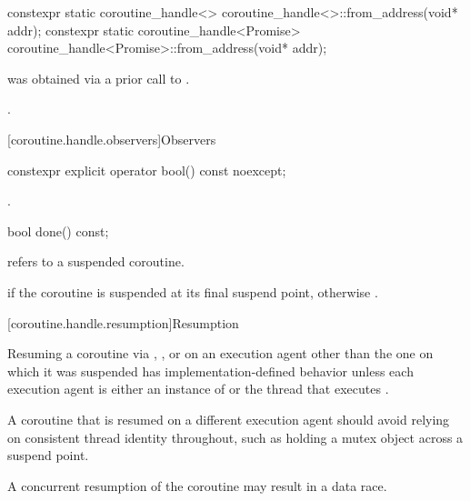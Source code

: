 %
\begin{itemdecl}
constexpr static coroutine_handle<> coroutine_handle<>::from_address(void* addr);
constexpr static coroutine_handle<Promise> coroutine_handle<Promise>::from_address(void* addr);
\end{itemdecl}

\begin{itemdescr}
\pnum
\requires {} was obtained via a prior call to .

\pnum
\ensures {}.
\end{itemdescr}

[coroutine.handle.observers]{Observers}

%
\begin{itemdecl}
constexpr explicit operator bool() const noexcept;
\end{itemdecl}

\begin{itemdescr}
\pnum
\returns {}.
\end{itemdescr}

%
\begin{itemdecl}
bool done() const;
\end{itemdecl}

\begin{itemdescr}
\pnum
\requires {} refers to a suspended coroutine.

\pnum
\returns {} if the coroutine is suspended at its
final suspend point, otherwise .
\end{itemdescr}

[coroutine.handle.resumption]{Resumption}

\pnum
Resuming a coroutine via , , or 
on an execution agent other than the one on which it was suspended
has implementation-defined behavior unless
each execution agent is either
an instance of  or
the thread that executes .
\begin{note}
A coroutine that is resumed on a different execution agent should
avoid relying on consistent thread identity throughout, such as holding
a mutex object across a suspend point.
\end{note}
\begin{note}
A concurrent resumption of the coroutine may result in a data race.
\end{note}

